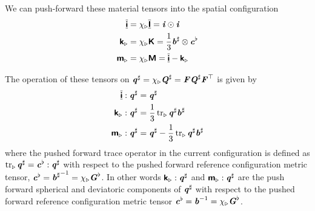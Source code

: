 We can push-forward these material tensors into the spatial configuration \ie
\begin{align}
    \overline{\underline{\boldsymbol{\mathsf{ i }}}}  &= \chi_{\triangleright}  \overline{\underline{\boldsymbol{\mathsf{ I }}}}   =   \boldsymbol{\mathit{ i }}   \odot   \boldsymbol{\mathit{ i }}   
  \\
     \boldsymbol{\mathsf{ k }}  _{\triangleright} &= \chi_{\triangleright}  \boldsymbol{\mathsf{ K }}   =\dfrac{1}{3}  \boldsymbol{\mathit{b}}^{\sharp}  \otimes \boldsymbol{\mathit{c}}^{\flat} \\
     \boldsymbol{\mathsf{ m }}  _{\triangleright} &= \chi_{\triangleright}  \boldsymbol{\mathsf{ M }}   =  \overline{\underline{\boldsymbol{\mathsf{ i }}}}  -   \boldsymbol{\mathsf{ k }}  _{\triangleright} 
\end{align}

The operation of these tensors on
$ \boldsymbol{\mathit{q}}^{\sharp} = \chi_{\triangleright} \boldsymbol{\mathit{Q}}^{\sharp}  =\boldsymbol{\mathit{F}} \boldsymbol{\mathit{Q}}^{\sharp}  {\boldsymbol{\mathit{F}}}^{ \top } $
is given by
\begin{align}
     \overline{\underline{\boldsymbol{\mathsf{ i }}}}   :  \boldsymbol{\mathit{q}}^{\sharp}  &= \boldsymbol{\mathit{q}}^{\sharp}  \\
      \boldsymbol{\mathsf{ k }}  _{\triangleright}  :  \boldsymbol{\mathit{q}}^{\sharp}  &=\dfrac{1}{3} \operatorname{tr}_{\triangleright}  \boldsymbol{\mathit{q}}^{\sharp}  \boldsymbol{\mathit{b}}^{\sharp}  \\
      \boldsymbol{\mathsf{ m }}  _{\triangleright}  :  \boldsymbol{\mathit{q}}^{\sharp}  &= \boldsymbol{\mathit{q}}^{\sharp} -\dfrac{1}{3} \operatorname{tr}_{\triangleright}  \boldsymbol{\mathit{q}}^{\sharp}  \boldsymbol{\mathit{b}}^{\sharp} 
\end{align}
where the pushed forward trace operator in the current configuration is
defined as
$ \operatorname{tr}_{\triangleright}  \boldsymbol{\mathit{q}}^{\sharp} = \boldsymbol{\mathit{c}}^{\flat} :  \boldsymbol{\mathit{q}}^{\sharp}  $
\ie with respect to the pushed forward reference configuration metric tensor,
$\boldsymbol{\mathit{c}}^{\flat}={ \boldsymbol{\mathit{b}}^{\sharp} }^{-1}= \chi_{\triangleright}\boldsymbol{\mathit{G}}^{\flat} $. In other words
$    \boldsymbol{\mathsf{ k }}  _{\triangleright}  :  \boldsymbol{\mathit{q}}^{\sharp}  $ and
$    \boldsymbol{\mathsf{ m }}  _{\triangleright}  :  \boldsymbol{\mathit{q}}^{\sharp}  $ are the push
forward spherical and deviatoric components of $ \boldsymbol{\mathit{q}}^{\sharp} $ with respect to
the pushed forward reference configuration metric tensor
$\boldsymbol{\mathit{c}}^{\flat}={\boldsymbol{\mathit{b}}}^{-1}= \chi_{\triangleright}\boldsymbol{\mathit{G}}^{\flat} $.

